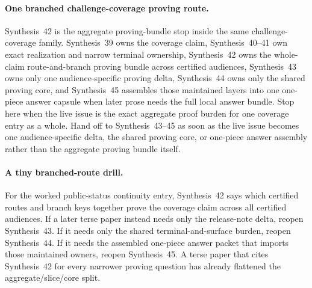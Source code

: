 \documentclass[11pt]{article}
\begin{document}
\paragraph{One branched challenge-coverage proving route.}
Synthesis~42 is the aggregate proving-bundle stop inside the same challenge-coverage family. Synthesis~39 owns the coverage claim, Synthesis~40--41 own exact realization and narrow terminal ownership, Synthesis~42 owns the whole-claim route-and-branch proving bundle across certified audiences, Synthesis~43 owns only one audience-specific proving delta, Synthesis~44 owns only the shared proving core, and Synthesis~45 assembles those maintained layers into one one-piece answer capsule when later prose needs the full local answer bundle. Stop here when the live issue is the exact aggregate proof burden for one coverage entry as a whole. Hand off to Synthesis~43--45 as soon as the live issue becomes one audience-specific delta, the shared proving core, or one-piece answer assembly rather than the aggregate proving bundle itself.

\paragraph{A tiny branched-route drill.}
For the worked public-status continuity entry, Synthesis~42 says which certified routes and branch keys together prove the coverage claim across all certified audiences. If a later terse paper instead needs only the release-note delta, reopen Synthesis~43. If it needs only the shared terminal-and-surface burden, reopen Synthesis~44. If it needs the assembled one-piece answer packet that imports those maintained owners, reopen Synthesis~45. A terse paper that cites Synthesis~42 for every narrower proving question has already flattened the aggregate/slice/core split.
\end{document}
